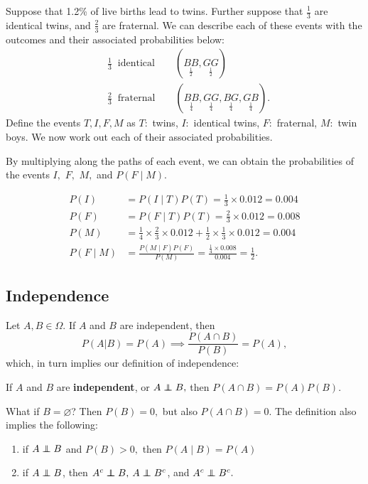 
\begin{eg}
Suppose that 1.2\% of live births lead to twins. Further suppose that $\frac{1}{3}$ are identical twins, and $\frac{2}{3}$ are fraternal. We can describe each of these events with the outcomes and their associated probabilities below:
\begin{align*}
		&\frac{1}{3} \ \text{ identical} \quad \quad (\underset{\frac{1}{2}}{BB},\underset{\frac{1}{2}}{GG})\\
		&\frac{2}{3} \ \text{ fraternal} \quad \quad (\underset{\frac{1}{4}}{BB},\underset{\frac{1}{4}}{GG},\underset{\frac{1}{4}}{BG}, \underset{\frac{1}{4}}{GB})
.\end{align*}
Define the events $T,I,F,M$ as $T:$ twins, $I:$ identical twins, $F:$ fraternal, $M:$ twin boys. We now work out each of their associated probabilities.

By multiplying along the paths of each event, we can obtain the probabilities of the events $I,$ $F,$ $M,$ and $P(F\mid M).$

\begin{align*}
	P(I)&=P(I\mid T)P(T)=\frac{1}{3}\times 0.012=0.004 \\
	P(F)&=P(F\mid T)P(T)=\frac{2}{3}\times 0.012 = 0.008 \\
	P(M)&=\frac{1}{4}\times \frac{2}{3} \times 0.012 + \frac{1}{2}\times \frac{1}{3} \times 0.012 = 0.004 \\
	P(F\mid M)&=\frac{P(M\mid F)P(F)}{P\left( M \right) }=\frac{\frac{1}{4}\times 0.008}{0.004}=\frac{1}{2}
.\end{align*}

\end{eg}

\subsection{Independence}
Let $A,B\in \Omega.$ If $A$ and $B$ are independent, then
$$
P(A|B)=P(A) \implies \frac{P(A\cap B)}{P(B)}=P(A),
$$
which, in turn implies our definition of independence:
\begin{definition}
If $A$ and $B$ are \textbf{independent}, or $A\ind B,$ then $P(A\cap B)=P(A)P(B).$ 
\end{definition}

What if $B=\varnothing$? Then $P(B)=0,$ but also $P(A\cap B)=0.$ The definition also implies the following:
\begin{enumerate}[(i.)]
    \item if $A\ind B$ and $P(B)>0,$ then $P(A\mid B)=P(A)$
    \item if $A\ind B$, then $A^c\ind B,$ $A\ind B^c$, and $A^c\ind B^c.$
\end{enumerate}

